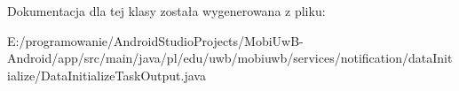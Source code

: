 Dokumentacja dla tej klasy została wygenerowana z pliku\+:\begin{DoxyCompactItemize}
\item 
E\+:/programowanie/\+Android\+Studio\+Projects/\+Mobi\+Uw\+B-\/\+Android/app/src/main/java/pl/edu/uwb/mobiuwb/services/notification/data\+Initialize/Data\+Initialize\+Task\+Output.\+java\end{DoxyCompactItemize}
